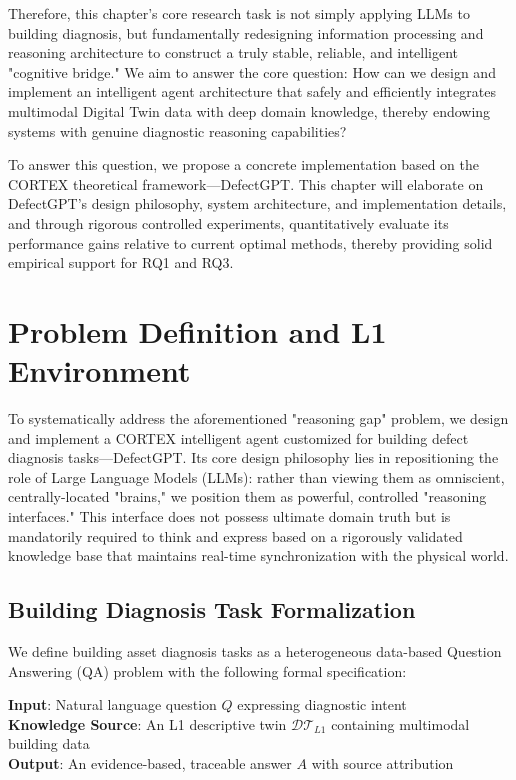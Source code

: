 Therefore, this chapter's core research task is not simply applying LLMs to building diagnosis, but fundamentally redesigning information processing and reasoning architecture to construct a truly stable, reliable, and intelligent "cognitive bridge." We aim to answer the core question: How can we design and implement an intelligent agent architecture that safely and efficiently integrates multimodal Digital Twin data with deep domain knowledge, thereby endowing systems with genuine diagnostic reasoning capabilities?

To answer this question, we propose a concrete implementation based on the CORTEX theoretical framework—DefectGPT. This chapter will elaborate on DefectGPT's design philosophy, system architecture, and implementation details, and through rigorous controlled experiments, quantitatively evaluate its performance gains relative to current optimal methods, thereby providing solid empirical support for RQ1 and RQ3.

\section{Problem Definition and L1 Environment}

To systematically address the aforementioned "reasoning gap" problem, we design and implement a CORTEX intelligent agent customized for building defect diagnosis tasks—DefectGPT. Its core design philosophy lies in repositioning the role of Large Language Models (LLMs): rather than viewing them as omniscient, centrally-located "brains," we position them as powerful, controlled "reasoning interfaces." This interface does not possess ultimate domain truth but is mandatorily required to think and express based on a rigorously validated knowledge base that maintains real-time synchronization with the physical world.

\subsection{Building Diagnosis Task Formalization}

We define building asset diagnosis tasks as a heterogeneous data-based Question Answering (QA) problem with the following formal specification:

\textbf{Input}: Natural language question $Q$ expressing diagnostic intent\\
\textbf{Knowledge Source}: An L1 descriptive twin $\mathcal{DT}_{L1}$ containing multimodal building data\\
\textbf{Output}: An evidence-based, traceable answer $A$ with source attribution

